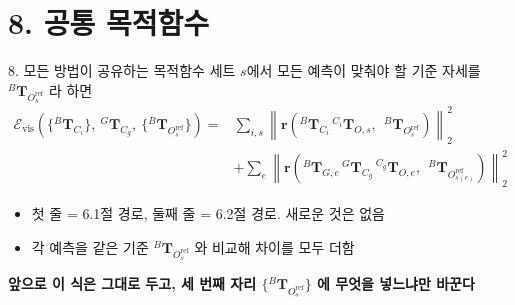 \documentclass[aspectratio=169,11pt]{beamer}
\newcommand{\T}[3][]{{}^{#2}\mathbf{T}^{#1}_{#3}}   %
\newcommand{\Oref}{O^{\mathrm{ref}}}   %
\begin{document}
\section{8. 공통 목적함수}

\begin{frame}{8. 모든 방법이 공유하는 목적함수}
  세트 $s$에서 모든 예측이 맞춰야 할 기준 자세를 $\T{B}{\Oref_s}$ 라 하면
  {\small
  \[
    \begin{aligned}
      \mathcal{E}_{\mathrm{vis}}
      \left(
        \{\T{B}{C_i}\},\ \T{G}{C_g},\ \{\T{B}{\Oref_s}\}
      \right)
      ={}&
      \sum_{i,s}
      \left\|
        \mathbf{r}\left(
          \T{B}{C_i}\,\T{C_i}{O,s},
          \ \ \T{B}{\Oref_s}
        \right)
      \right\|_2^2
      \\[4pt]
      &+
      \sum_e
      \left\|
        \mathbf{r}\left(
          \T{B}{G,e}\,\T{G}{C_g}\,\T{C_g}{O,e},
          \ \ \T{B}{\Oref_{s(e)}}
        \right)
      \right\|_2^2
    \end{aligned}
  \]
  }
  \vfill
  \begin{itemize}
    \item 첫 줄 = 6.1절 경로, 둘째 줄 = 6.2절 경로. 새로운 것은 없음
    \item 각 예측을 같은 기준 $\T{B}{\Oref_s}$ 와 비교해 차이를 모두 더함
  \end{itemize}
  \vfill
  \begin{alertblock}{}
    \centering
    \textbf{앞으로 이 식은 그대로 두고, 세 번째 자리
    $\{\T{B}{\Oref_s}\}$ 에 무엇을 넣느냐만 바꾼다}
  \end{alertblock}
\end{frame}
\end{document}
